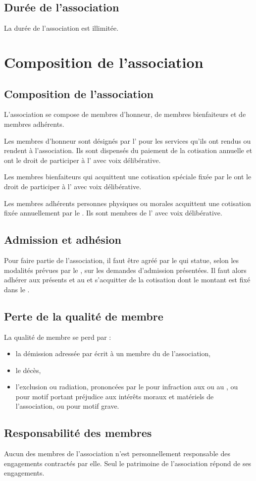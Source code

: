 \documentclass[a4paper,french,10pt]{article}
\newcommand{\article}[1]{\subsection{#1}\addtocounter{article}{1}}
\newcounter{article}
\begin{document}
\article{Durée de l’association}
\label{sec:duree}
La durée de l’association est illimitée.

\section{Composition de l’association}

\article{Composition de l’association}
\label{sec:composition}
L’association se compose de membres d'honneur, de membres bienfaiteurs
et de membres adhérents.

Les membres d'honneur sont désignés par l'\AG{} pour les
services qu'ils ont rendus ou rendent à l'association. Ils sont
dispensés du paiement de la cotisation annuelle et ont le droit de
participer à l'\AG{} avec voix délibérative.

Les membres bienfaiteurs qui acquittent une cotisation spéciale fixée
par le \RI{} ont le droit de participer à l'\AG{} avec voix délibérative.

Les membres adhérents personnes physiques ou morales acquittent une
cotisation fixée annuellement par le \RI{}. Ils sont
membres de l'\AG{} avec voix délibérative.

\article{Admission et adhésion}
\label{sec:admission}

Pour faire partie de l’association, il faut être agréé par le
\bureau{} qui statue, selon les modalités prévues par le \RI{}, sur
les demandes d'admission présentées. Il faut alors adhérer aux
présents \statuts{} et au \RI{} et s’acquitter de la cotisation dont
le montant est fixé dans le \RI{}.

\article{Perte de la qualité de membre}
\label{sec:perte}
La qualité de membre se perd par :
\begin{itemize}
\item la démission adressée par écrit à un membre du \bureau{} de l'association,

\item le décès,

\item l'exclusion ou radiation, prononcées par le \bureau{} pour infraction
aux \statuts{} ou au \RI{}, ou pour motif portant préjudice
aux intérêts moraux et matériels de l'association, ou pour motif
grave.
\end{itemize}


\article{Responsabilité des membres}
\label{sec:responsabilite}
Aucun des membres de l’association n’est personnellement responsable
des engagements contractés par elle. Seul le patrimoine de
l’association répond de ses engagements.
\end{document}
